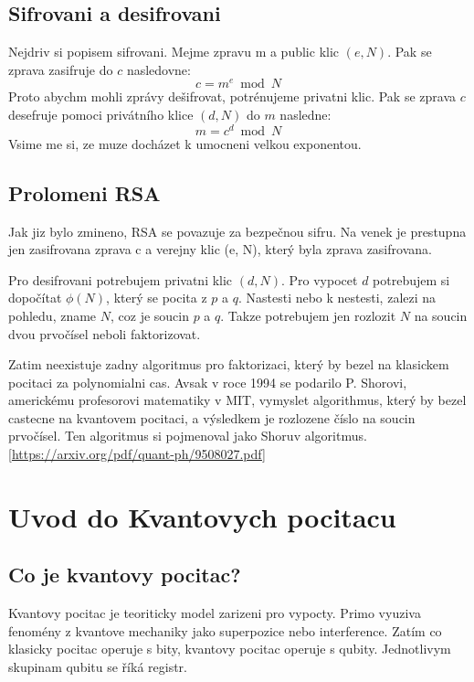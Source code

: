 \documentclass[11pt]{article}
\begin{document}
\subsection{Sifrovani a desifrovani}
Nejdriv si popisem sifrovani.
Mejme zpravu m a public klic $(e, N)$. Pak se zprava zasifruje do $c$ nasledovne:
$$c = m^e \bmod N$$
Proto abychm mohli zprávy dešifrovat, potrénujeme privatni klic. Pak se zprava $c$ desefruje pomoci privátního klice $(d, N)$ do $m$ nasledne:
$$m = c^d \bmod N$$
Vsime me si, ze muze docházet k umocneni velkou exponentou.

\subsection{Prolomeni RSA}
Jak jiz bylo zmineno, RSA se povazuje za bezpečnou sifru. Na venek je prestupna jen zasifrovana zprava c a verejny klic (e, N), který byla zprava zasifrovana.

\par Pro desifrovani potrebujem privatni klic $(d, N)$.
Pro vypocet $d$ potrebujem si dopočítat $\phi (N)$, který se pocita z $p$ a $q$.
Nastesti nebo k nestesti, zalezi na pohledu, zname $N$, coz je soucin $p$ a $q$.
Takze potrebujem jen rozlozit $N$ na soucin dvou prvočísel neboli faktorizovat.

\par Zatim neexistuje zadny algoritmus pro faktorizaci, který by bezel na klasickem pocitaci za polynomialni cas.
Avsak v roce 1994 se podarilo P. Shorovi, americkému profesorovi matematiky v MIT, vymyslet algorithmus, který by bezel castecne na kvantovem pocitaci, a výsledkem je rozlozene číslo na soucin prvočísel.
Ten algoritmus si pojmenoval jako Shoruv algoritmus.[\url{https://arxiv.org/pdf/quant-ph/9508027.pdf}]


\newpage

\section{Uvod do Kvantovych pocitacu}
\subsection{Co je kvantovy pocitac?}
Kvantovy pocitac je teoriticky model zarizeni pro vypocty.
Primo vyuziva fenomény z kvantove mechaniky jako superpozice nebo interference.
Zatím co klasicky pocitac operuje s bity, kvantovy pocitac operuje s qubity.
Jednotlivym skupinam qubitu se říká registr.
\end{document}
